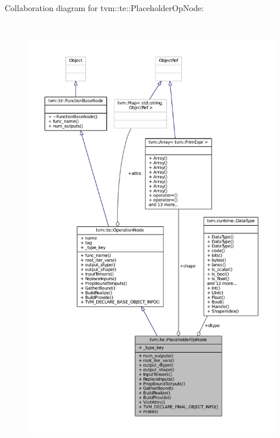 Collaboration diagram for tvm\+:\+:te\+:\+:Placeholder\+Op\+Node\+:
\nopagebreak
\begin{figure}[H]
\begin{center}
\leavevmode
\includegraphics[height=550pt]{classtvm_1_1te_1_1PlaceholderOpNode__coll__graph}
\end{center}
\end{figure}
